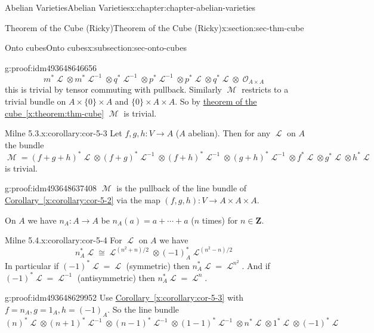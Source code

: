 \documentclass[oneside,10pt,]{book}
\numberwithin{equation}{section}
\newcommand{\sheaf}[1]{\operatorname{\mathcal{#1}}}
\newcommand{\ZZ}{\mathbf{Z}}
\begin{document}
\begin{chapterptx}{Abelian Varieties}{}{Abelian Varieties}{}{}{x:chapter:chapter-abelian-varieties}
\begin{sectionptx}{Theorem of the Cube (Ricky)}{}{Theorem of the Cube (Ricky)}{}{}{x:section:sec-thm-cube}
\begin{subsectionptx}{Onto cubes}{}{Onto cubes}{}{}{x:subsection:sec-onto-cubes}
\begin{proofptx}{}{g:proof:idm493648646656}
\begin{equation*}
m^* \sheaf L \otimes m^* \sheaf L^{-1} \otimes q^* \sheaf L^{-1} \otimes p^*\sheaf L^{-1} \otimes p^*\sheaf L \otimes q^*\sheaf L \otimes \sheaf O_{A\times A}
\end{equation*}
this is trivial by tensor commuting with pullback. Similarly \(\sheaf M\) restricts to a trivial bundle on \(A\times \{0\} \times A\) and \(\{0\}\times A \times A\). So by \hyperref[x:theorem:thm-cube]{theorem of the cube~\ref{x:theorem:thm-cube}} \(\sheaf M\) is trivial.%
\end{proofptx}
\begin{corollary}{Milne 5.3.}{}{x:corollary:cor-5-3}%
Let \(f,g, h\colon V \to A\) (\(A\) abelian). Then for any \(\sheaf L\) on \(A\) the bundle%
\begin{equation*}
\sheaf M  = (f+g+h)^*\sheaf L \otimes (f+g)^*\sheaf L^{-1}\otimes (f+h)^*\sheaf L^{-1}\otimes (g+h)^*\sheaf L^{-1} \otimes   f^*\sheaf L \otimes   g^*\sheaf L \otimes   h^*\sheaf L
\end{equation*}
is trivial.%
\end{corollary}
\begin{proofptx}{}{g:proof:idm493648637408}
\(\sheaf M\) is the pullback of the line bundle of \hyperref[x:corollary:cor-5-2]{Corollary~\ref{x:corollary:cor-5-2}} via the map \((f,g,h) \colon V \to A\times A\times A\).%
\end{proofptx}
On \(A\) we have \(n_A \colon A\to A\) be \(n_A(a) = a+\cdots + a\) (\(n\) times) for \(n\in \ZZ\).%
\begin{corollary}{Milne 5.4.}{}{x:corollary:cor-5-4}%
For \(\sheaf L\) on \(A\) we have%
\begin{equation*}
n^*_A\sheaf L \cong \sheaf L^{(n^2 + n)/2} \otimes (-1)_A^* \sheaf L^{(n^2 - n)/2}
\end{equation*}
In particular if \((-1)^* \sheaf L = \sheaf L\) (symmetric) then \(n_A^* \sheaf L = \sheaf L^{n^2}\). And if \((-1)^* \sheaf L = \sheaf L^{-1}\) (antisymmetric) then \(n_A^* \sheaf L = \sheaf L^{n}\).%
\end{corollary}
\begin{proofptx}{}{g:proof:idm493648629952}
Use \hyperref[x:corollary:cor-5-3]{Corollary~\ref{x:corollary:cor-5-3}} with \(f= n_A, g = 1_A, h = (-1)_A\). So the line bundle%
\begin{equation*}
(n)^*\sheaf L \otimes (n+1)^*\sheaf L^{-1}\otimes (n-1)^*\sheaf L^{-1}\otimes (1-1)^*\sheaf L^{-1} \otimes   n^*\sheaf L \otimes   1^*\sheaf L \otimes   (-1)^*\sheaf L
\end{equation*}

\end{proofptx}
\end{subsectionptx}
\end{sectionptx}
\end{chapterptx}
\end{document}
